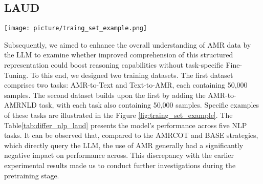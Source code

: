 \subsection{LAUD}
\begin{figure*}[h!]
\centering
\vspace{-0.1in}
\texttt{[image: picture/traing\_set\_example.png]}
\caption{Trainig Set Example.}
\label{fig:traing_set_example}
\vspace{-0.1in}
\end{figure*}

Subsequently, we aimed to enhance the overall understanding of AMR data by the LLM to examine whether improved comprehension of this structured representation could boost reasoning capabilities without task-specific Fine-Tuning. To this end, we designed two training datasets. The first dataset comprises two tasks: AMR-to-Text and Text-to-AMR, each containing 50,000 samples. The second dataset builds upon the first by adding the AMR-to-AMRNLD task, with each task also containing 50,000 samples. Specific examples of these tasks are illustrated in the Figure \ref{fig:traing_set_example}.
The Table\ref{tab:differ_nlp_laud} presents the model's performance across five NLP tasks. It can be observed that, compared to the AMRCOT and BASE strategies, which directly query the LLM, the use of AMR generally had a significantly negative impact on performance across. This discrepancy with the earlier experimental results made us to conduct further investigations during the pretraining stage.


